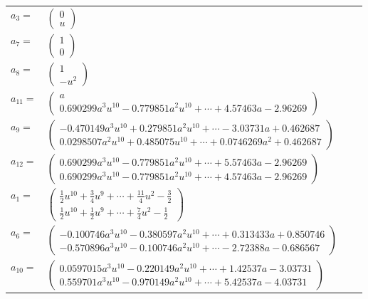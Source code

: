 \documentclass[1p]{elsarticle_modified}
\theoremstyle{definition}
\begin{document}
\begin{tabular}{m{7pt} m{180pt} m{7pt} m{180pt} }
\flushright $a_{3}=$&$\begin{pmatrix}0\\u\end{pmatrix}$ \\
\flushright $a_{7}=$&$\begin{pmatrix}1\\0\end{pmatrix}$ \\
\flushright $a_{8}=$&$\begin{pmatrix}1\\- u^2\end{pmatrix}$ \\
\flushright $a_{11}=$&$\begin{pmatrix}a\\0.690299 a^{3} u^{10}-0.779851 a^{2} u^{10}+\cdots+4.57463 a-2.96269\end{pmatrix}$ \\
\flushright $a_{9}=$&$\begin{pmatrix}-0.470149 a^{3} u^{10}+0.279851 a^{2} u^{10}+\cdots-3.03731 a+0.462687\\0.0298507 a^{2} u^{10}+0.485075 u^{10}+\cdots+0.0746269 a^{2}+0.462687\end{pmatrix}$ \\
\flushright $a_{12}=$&$\begin{pmatrix}0.690299 a^{3} u^{10}-0.779851 a^{2} u^{10}+\cdots+5.57463 a-2.96269\\0.690299 a^{3} u^{10}-0.779851 a^{2} u^{10}+\cdots+4.57463 a-2.96269\end{pmatrix}$ \\
\flushright $a_{1}=$&$\begin{pmatrix}\frac{1}{2} u^{10}+\frac{3}{4} u^9+\cdots+\frac{11}{4} u^2-\frac{3}{2}\\\frac{1}{2} u^{10}+\frac{1}{2} u^9+\cdots+\frac{7}{4} u^2-\frac{1}{2}\end{pmatrix}$ \\
\flushright $a_{6}=$&$\begin{pmatrix}-0.100746 a^{3} u^{10}-0.380597 a^{2} u^{10}+\cdots+0.313433 a+0.850746\\-0.570896 a^{3} u^{10}-0.100746 a^{2} u^{10}+\cdots-2.72388 a-0.686567\end{pmatrix}$ \\
\flushright $a_{10}=$&$\begin{pmatrix}0.0597015 a^{3} u^{10}-0.220149 a^{2} u^{10}+\cdots+1.42537 a-3.03731\\0.559701 a^{3} u^{10}-0.970149 a^{2} u^{10}+\cdots+5.42537 a-4.03731\end{pmatrix}$ \\

\end{tabular}
\end{document}
